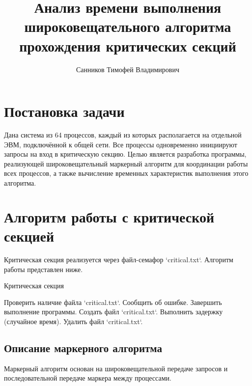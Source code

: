 \documentclass[openany, twoside, a4paper, 12pt]{extbook}
\author{Санников Тимофей Владимирович}
\title{Анализ времени выполнения широковещательного алгоритма прохождения критических секций}
\begin{document}
\maketitle

\section*{Постановка задачи}
Дана система из 64 процессов, каждый из которых располагается на отдельной ЭВМ,
подключённой к общей сети.
Все процессы одновременно инициируют запросы на вход в критическую секцию.
Целью является разработка программы,
реализующей широковещательный маркерный алгоритм для координации работы всех процессов,
а также вычисление временных характеристик выполнения этого алгоритма.

\section*{Алгоритм работы с критической секцией}
Критическая секция реализуется через файл-семафор `critical.txt`. Алгоритм работы представлен ниже.

\begin{algorithm}
\caption{Критическая секция}
\begin{algorithmic}[1]
\STATE Проверить наличие файла `critical.txt`.
    \STATE Сообщить об ошибке.
    \STATE Завершить выполнение программы.
\ELSE
    \STATE Создать файл `critical.txt`.
    \STATE Выполнить задержку (случайное время).
    \STATE Удалить файл `critical.txt`.
\ENDIF
\end{algorithmic}
\end{algorithm}

\subsection*{Описание маркерного алгоритма}
Маркерный алгоритм основан на широковещательной передаче запросов и последовательной передаче маркера между процессами.
\end{document}
